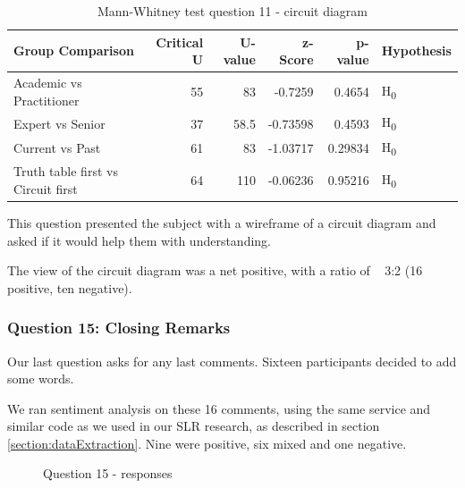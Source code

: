 \begin{table}
    \begin{center}
        \begin{tabular}{ |l ||r |r |r | r|l | } 
            \hline
            Group Comparison                   & Critical U & U-value & z-Score  & p-value & Hypothesis         \\
            \hline
            \hline
            Academic vs Practitioner           & 55         & 83      & -0.7259  & 0.4654  & H\textsubscript{0} \\ 
            \hline
            Expert vs Senior                   & 37         & 58.5    & -0.73598 & 0.4593  & H\textsubscript{0} \\ 
            \hline
            Current vs Past                    & 61         & 83      & -1.03717 & 0.29834 & H\textsubscript{0} \\ 
            \hline
            Truth table first vs Circuit first & 64         & 110     & -0.06236 & 0.95216 & H\textsubscript{0} \\ 
            \hline
        \end{tabular}
    \end{center}
    \caption{Mann-Whitney test question 11 - circuit diagram}
    \label{table:mannwhitneyQ7}
\end{table}

This question presented the subject with a wireframe of a circuit diagram and asked if it would help them with understanding.

The view of the circuit diagram was a net positive, with a ratio of ~ 3:2 (16 positive, ten negative).

\subsubsection{Question 15: Closing Remarks}

Our last question asks for any last comments.
Sixteen participants decided to add some words.

We ran sentiment analysis on these 16 comments, using the same service and similar code as we used in our SLR research, as described in section \ref{section:dataExtraction}.
Nine were positive, six mixed and one negative.

\begin{figure}
    \centering
    \caption{Question 15 - responses}
    \label{fig:Q15_wordcloud}
\end{figure}

